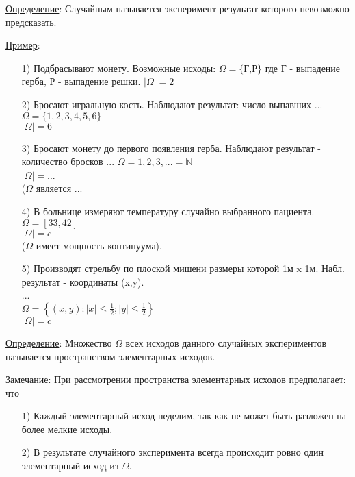 
\underline{Определение}: Случайным называется эксперимент результат которого невозможно предсказать.

\underline{Пример}:
\begin{enumerate}
	\item[1)]
	Подбрасывают монету. Возможные исходы:
	$\Omega = \{ \text{Г,Р} \}$
	где Г - выпадение герба, Р - выпадение решки.
	$| \Omega | = 2$
	
	\item[2)]
	Бросают игральную кость. Наблюдают результат: число выпавших ...
	$\Omega = \{ 1,2,3,4,5,6 \}$ \\
	$| \Omega | = 6$
	
	\item[3)]
	Бросают монету до первого появления герба. Наблюдают результат - количество бросков ...
	$\Omega = {1,2,3, ...} = \mathbb{N}$ \\
	$|\Omega| = $... \\
	($\Omega$ является ...
	
	\item[4)] 
	В больнице измеряют температуру случайно выбранного пациента.
	$\Omega = [33, 42]$ \\
	$|\Omega| = c$ \\
	($\Omega$ имеет мощность континуума).
	
	\item[5)]
	Производят стрельбу по плоской мишени размеры которой 1м x 1м. Набл. результат - координаты (x,y). \\
	... \\
	$\Omega = \left\{ (x,y): |x| \leqslant \frac{1}{2}; |y| \leqslant \frac{1}{2} \right\}$ \\
	$|\Omega| = c$ \\
	

\end{enumerate}

\underline{Определение}: Множество $\Omega$ всех исходов данного случайных экспериментов называется пространством элементарных исходов.
	
\underline{Замечание}: При рассмотрении пространства элементарных исходов предполагает: что
\begin{enumerate}
	\item[1)] 
	Каждый элементарный исход неделим, так как не может быть разложен на более мелкие исходы.
	
	\item[2)]
	В результате случайного эксперимента всегда происходит ровно один элементарный исход из $\Omega$.
\end{enumerate}
	
